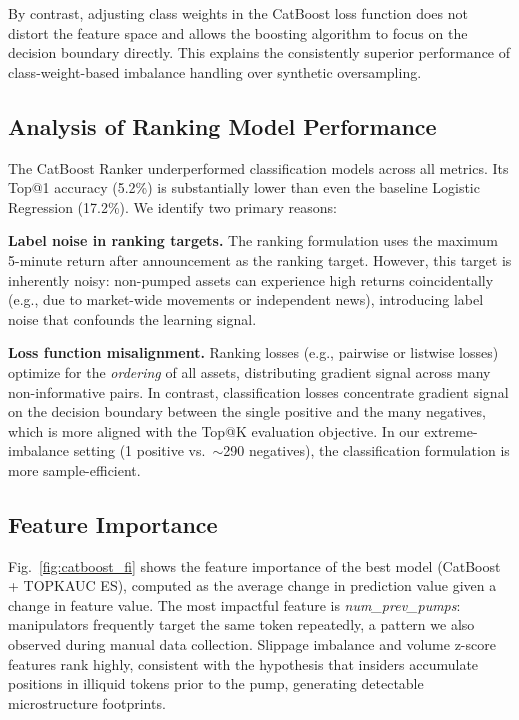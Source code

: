 \documentclass{ieeeaccess}
\begin{document}
By contrast, adjusting class weights in the CatBoost loss function does not distort the feature space and allows the boosting algorithm to focus on the decision boundary directly. This explains the consistently superior performance of class-weight-based imbalance handling over synthetic oversampling.


\subsection{Analysis of Ranking Model Performance}

The CatBoost Ranker underperformed classification models across all metrics. Its Top@1 accuracy (5.2\%) is substantially lower than even the baseline Logistic Regression (17.2\%). We identify two primary reasons:

\textbf{Label noise in ranking targets.}
The ranking formulation uses the maximum 5-minute return after announcement as the ranking target. However, this target is inherently noisy: non-pumped assets can experience high returns coincidentally (e.g., due to market-wide movements or independent news), introducing label noise that confounds the learning signal.

\textbf{Loss function misalignment.}
Ranking losses (e.g., pairwise or listwise losses) optimize for the \emph{ordering} of all assets, distributing gradient signal across many non-informative pairs. In contrast, classification losses concentrate gradient signal on the decision boundary between the single positive and the many negatives, which is more aligned with the Top@K evaluation objective. In our extreme-imbalance setting (1 positive vs.\ $\sim$290 negatives), the classification formulation is more sample-efficient.


\subsection{Feature Importance}

Fig.~\ref{fig:catboost_fi} shows the feature importance of the best model (CatBoost + TOPKAUC ES), computed as the average change in prediction value given a change in feature value. The most impactful feature is \textit{num\_prev\_pumps}: manipulators frequently target the same token repeatedly, a pattern we also observed during manual data collection. Slippage imbalance and volume z-score features rank highly, consistent with the hypothesis that insiders accumulate positions in illiquid tokens prior to the pump, generating detectable microstructure footprints.
\end{document}
